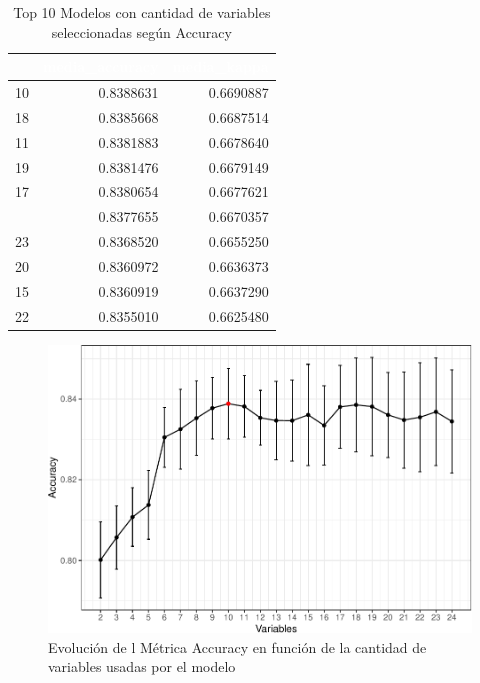 \begin{table}[!h]
	
	\caption{\label{tab:top_10_rfe_accuracy}Top 10 Modelos con cantidad de variables seleccionadas según Accuracy}
	\centering
	\begin{tabular}[t]{rrr}
		\toprule
		\rowcolor{black}  \multicolumn{1}{c}{\textcolor{white}{\textbf{Variables}}} & \multicolumn{1}{c}{\textcolor{white}{\textbf{media\_accuracy}}} & \multicolumn{1}{c}{\textcolor{white}{\textbf{media\_kappa}}}\\
		\midrule
		\rowcolor{gray!6}  10 & 0.8388631 & 0.6690887\\
		18 & 0.8385668 & 0.6687514\\
		\rowcolor{gray!6}  11 & 0.8381883 & 0.6678640\\
		19 & 0.8381476 & 0.6679149\\
		\rowcolor{gray!6}  17 & 0.8380654 & 0.6677621\\
		\addlinespace
		9 & 0.8377655 & 0.6670357\\
		\rowcolor{gray!6}  23 & 0.8368520 & 0.6655250\\
		20 & 0.8360972 & 0.6636373\\
		\rowcolor{gray!6}  15 & 0.8360919 & 0.6637290\\
		22 & 0.8355010 & 0.6625480\\
		\bottomrule
	\end{tabular}
\end{table}

\begin{figure}[!htb]
	\centering
	\includegraphics{imagenes/variables/rfe_evolucion_accuracy-1.pdf}
	\caption{Evolución de l Métrica Accuracy en función de la cantidad de variables usadas por el modelo}
	\label{fig:rfe_evolucion_accuracy}
\end{figure}

